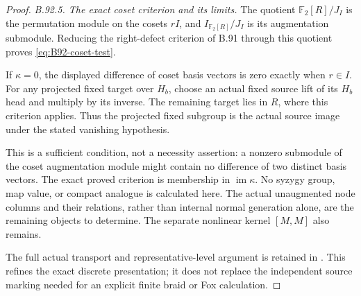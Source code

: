 \begin{proof}
\emph{B.92.5. The exact coset criterion and its limits.}
The quotient $\mathbb F_2[R]/J_I$ is the permutation module on
the cosets $rI$, and $I_{\mathbb F_2[R]}/J_I$ is its augmentation
submodule. Reducing the right-defect criterion of B.91 through
this quotient proves \eqref{eq:B92-coset-test}.

If $\kappa=0$, the displayed difference of coset basis vectors is
zero exactly when $r\in I$. For any projected fixed target over
$H_b$, choose an actual fixed source lift of its $H_b$ head and
multiply by its inverse. The remaining target lies in $R$, where
this criterion applies. Thus the projected fixed subgroup is the
actual source image under the stated vanishing hypothesis.

This is a sufficient condition, not a necessity assertion: a
nonzero submodule of the coset augmentation module might contain
no difference of two distinct basis vectors. The exact proved
criterion is membership in $\operatorname{im}\kappa$.
No syzygy group, map value, or compact analogue is calculated
here. The actual unaugmented node columns and their relations,
rather than internal normal generation alone, are the remaining
objects to determine. The separate nonlinear kernel $[M,M]$
also remains.

\begingroup\raggedright
The full actual transport and representative-level argument is
retained in
.
This refines the exact discrete presentation; it does not replace
the independent source marking needed for an explicit finite
braid or Fox calculation.\par
\endgroup
\end{proof}

